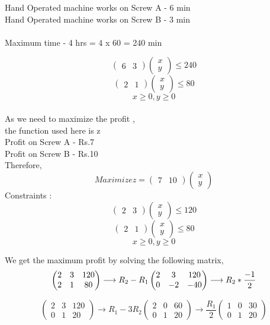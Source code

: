 \documentclass[journal,10pt]{article}
\newcommand{\myvec}[1]{\ensuremath{\begin{pmatrix}#1\end{pmatrix}}}
\begin{document}
Hand Operated machine works on Screw A - 6 min\\
Hand Operated machine works on Screw B - 3 min\\\\
Maximum time - 4 hrs = 4 x 60 = 240 min

\begin{equation}
	\myvec{6 &3}\myvec{x\\y} \leq 240
\end{equation}
\begin{equation}
	\myvec{2&1}\myvec{x\\y} \leq 80
\end{equation}
\begin{equation}
	x\geq 0 , y\geq 0
\end{equation}
\\
As we need to maximize the profit ,\\
the function used here is z \\
Profit on Screw A - Rs.7\\
Profit on Screw B - Rs.10\\
Therefore,
\begin{equation}
	Maximize z = \myvec{7&10}\myvec{x\\y}
\end{equation}
Constraints :
\begin{equation}
	\myvec{2&3}\myvec{x\\y} \leq 120
\end{equation}
\begin{equation}
	\myvec{2&1}\myvec{x\\y} \leq 80
\end{equation}
\begin{equation}
	x \geq 0 , y\geq 0
\end{equation}

We get the maximum profit by solving the following matrix,
\begin{equation}
	\myvec{2&3&120\\2&1&80} \longrightarrow {R_2 - R_1} \myvec{2&3&120\\0&-2&-40} \longrightarrow{R_2*\frac{-1}{2}} \\ 
\end{equation}

\begin{equation}
	\myvec{2&3&120\\0&1&20} \longrightarrow{R_1-3R_2} \myvec{2&0&60\\0&1&20} \longrightarrow{\frac{R_1}{2}} \myvec{1&0&30\\0&1&20}
\end{equation}
\end{document}
